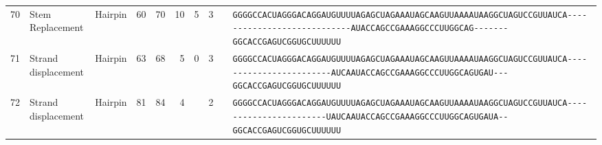 \begin{tabular}{rllrrrrrcl}
 70 & Stem Replacement & Hairpin & 60 & 70 & 10 & 5 & 3 &  &                                                                                                                                                       
 \color{ucsfdarkgrey}\verb|GGGGCCACUAGGGACAGGAU|\color{ucsforange}\verb|GUUUUA|\color{ucsfblue}\verb|GAGCUAGAAAUAGCAAGU|\color{ucsforange}\verb|UAAAAUAA|\color{ucsfnavy}\verb|GGCUAGUCC|\color{ucsforange}\verb|GUUAUCA|\color{ucsfteal}\verb|----------------------------|\color{ucsfpurple}\verb|AUACCAGCCGAAAGGCCCUUGGCAG|\color{ucsfteal}\verb|-------|\color{ucsforange}\verb|GGCACCGAGUCGGUGCUUUUUU| \\
                                                                                                                                                                                                                   
 71 & Strand displacement & Hairpin & 63 & 68 & 5 & 0 & 3 &  &                                                                                                                                                     
 \color{ucsfdarkgrey}\verb|GGGGCCACUAGGGACAGGAU|\color{ucsforange}\verb|GUUUUA|\color{ucsfblue}\verb|GAGCUAGAAAUAGCAAGU|\color{ucsforange}\verb|UAAAAUAA|\color{ucsfnavy}\verb|GGCUAGUCC|\color{ucsforange}\verb|GUUAUCA|\color{ucsfteal}\verb|------------------------AUCA|\color{ucsfpurple}\verb|AUACCAGCCGAAAGGCCCUUGGCAG|\color{ucsfteal}\verb|UGAU---|\color{ucsforange}\verb|GGCACCGAGUCGGUGCUUUUUU| \\
                                                                                                                                                                                                                   
 72 & Strand displacement & Hairpin & 81 & 84 & 4 &   & 2 &  &                                                                                                                                                     
 \color{ucsfdarkgrey}\verb|GGGGCCACUAGGGACAGGAU|\color{ucsforange}\verb|GUUUUA|\color{ucsfblue}\verb|GAGCUAGAAAUAGCAAGU|\color{ucsforange}\verb|UAAAAUAA|\color{ucsfnavy}\verb|GGCUAGUCC|\color{ucsforange}\verb|GUUAUCA|\color{ucsfteal}\verb|-----------------------UAUCA|\color{ucsfpurple}\verb|AUACCAGCCGAAAGGCCCUUGGCAG|\color{ucsfteal}\verb|UGAUA--|\color{ucsforange}\verb|GGCACCGAGUCGGUGCUUUUUU| \\
                                                                                                                                                                                                                   

\end{tabular}
